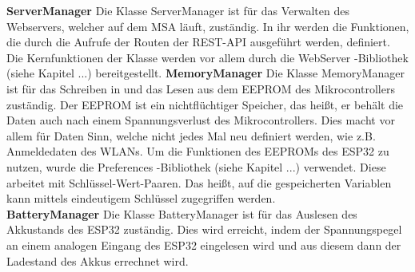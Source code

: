\documentclass[11pt, twoside]{article}
\begin{document}
\vspace{4mm}\newline
\textbf{ServerManager}\newline
Die Klasse \glqq ServerManager \grqq{} ist für das Verwalten des Webservers, welcher auf dem MSA läuft, zuständig. In ihr werden die Funktionen, die durch die Aufrufe der Routen der REST-API ausgeführt werden, definiert. Die Kernfunktionen der Klasse werden vor allem durch die \glqq WebServer \grqq{} -Bibliothek (siehe Kapitel ...) bereitgestellt.
\vspace{4mm}\newline
\textbf{MemoryManager} \newline
Die Klasse \glqq MemoryManager \grqq{} ist für das Schreiben in und das Lesen aus dem EEPROM des Mikrocontrollers zuständig. Der EEPROM ist ein nichtflüchtiger Speicher, das heißt, er behält die Daten auch nach einem Spannungsverlust des Mikrocontrollers. Dies macht vor allem für Daten Sinn, welche nicht jedes Mal neu definiert werden, wie z.B. Anmeldedaten des WLANs. \parencite[vgl.][]{santos_urlpi27_2018}
Um die Funktionen des EEPROMs des ESP32 zu nutzen, wurde die \glqq Preferences \grqq{} -Bibliothek (siehe Kapitel ...) verwendet. Diese arbeitet mit Schlüssel-Wert-Paaren. Das heißt, auf die gespeicherten Variablen kann mittels eindeutigem Schlüssel zugegriffen werden.
\newline \\
\textbf{BatteryManager} \newline
Die Klasse \glqq BatteryManager \grqq{} ist für das Auslesen des Akkustands des ESP32 zuständig. Dies wird erreicht, indem der Spannungspegel an einem analogen Eingang des ESP32 eingelesen wird und aus diesem dann der Ladestand des Akkus errechnet wird.
\end{document}
